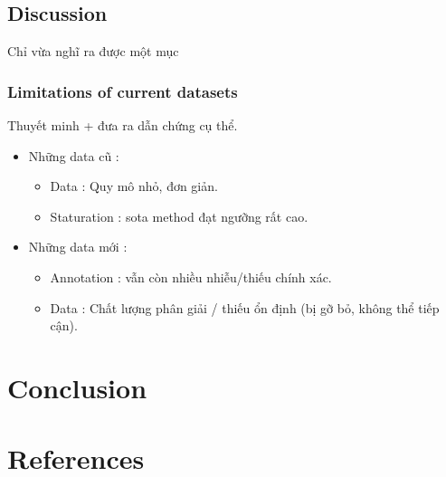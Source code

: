 \documentclass[a4paper]{article}
\begin{document}
\subsection{Discussion}

Chỉ vừa nghĩ ra được một mục

\subsubsection{Limitations of current datasets}

Thuyết minh + đưa ra dẫn chứng cụ thể.

\begin{itemize}
	\item Những data cũ :
	\begin{itemize}
		\item Data : Quy mô nhỏ, đơn giản.
		\item Staturation : sota method đạt ngưỡng rất cao.
	\end{itemize}
	
	\item Những data mới :
	\begin{itemize}
		\item Annotation : vẫn còn nhiều nhiễu/thiếu chính xác.
		\item Data : Chất lượng phân giải / thiếu ổn định (bị gỡ bỏ, không thể tiếp cận).
	\end{itemize}
	
\end{itemize}

\section{Conclusion}

\section{References}

\end{document}
